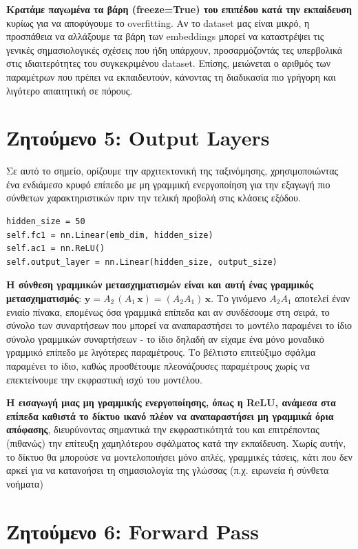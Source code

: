 \documentclass[12pt]{article}
\begin{document}
\textbf{Κρατάμε παγωμένα τα βάρη (freeze=True) του επιπέδου κατά την εκπαίδευση} κυρίως για να αποφύγουμε το overfitting. Αν το dataset μας είναι μικρό, η προσπάθεια να αλλάξουμε τα βάρη των embeddings μπορεί να καταστρέψει τις γενικές σημασιολογικές σχέσεις που ήδη υπάρχουν, προσαρμόζοντάς τες υπερβολικά στις ιδιαιτερότητες του συγκεκριμένου dataset. Επίσης, μειώνεται ο αριθμός των παραμέτρων που πρέπει να εκπαιδευτούν, κάνοντας τη διαδικασία πιο γρήγορη και λιγότερο απαιτητική σε πόρους.

\section{Ζητούμενο 5: Output Layers}

Σε αυτό το σημείο, ορίζουμε την αρχιτεκτονική της ταξινόμησης, χρησιμοποιώντας ένα ενδιάμεσο κρυφό επίπεδο με μη γραμμική ενεργοποίηση για την εξαγωγή πιο σύνθετων χαρακτηριστικών πριν την τελική προβολή στις κλάσεις εξόδου.

\begin{lstlisting}
hidden_size = 50
self.fc1 = nn.Linear(emb_dim, hidden_size)
self.ac1 = nn.ReLU()
self.output_layer = nn.Linear(hidden_size, output_size)
\end{lstlisting}


\textbf{Η σύνθεση γραμμικών μετασχηματισμών είναι και αυτή ένας γραμμικός μετασχηματισμός}:
$ \mathbf{y} = A_2\,(A_1\,\mathbf{x}) = (A_2 A_1)\,\mathbf{x} $.
Το γινόμενο $A_2 A_1$ αποτελεί έναν ενιαίο πίνακα, επομένως όσα γραμμικά επίπεδα και αν συνδέσουμε στη σειρά, το σύνολο των συναρτήσεων που μπορεί να αναπαραστήσει το μοντέλο παραμένει το ίδιο σύνολο γραμμικών συναρτήσεων - το ίδιο δηλαδή αν είχαμε ένα μόνο μοναδικό γραμμικό επίπεδο με λιγότερες παραμέτρους. Το βέλτιστο επιτεύξιμο σφάλμα παραμένει το ίδιο, καθώς προσθέτουμε πλεονάζουσες παραμέτρους χωρίς να επεκτείνουμε την εκφραστική ισχύ του μοντέλου.

\textbf{Η εισαγωγή μιας μη γραμμικής ενεργοποίησης, όπως η ReLU, ανάμεσα στα επίπεδα καθιστά το δίκτυο ικανό πλέον να αναπαραστήσει μη γραμμικά όρια απόφασης}, διευρύνοντας σημαντικά την εκφραστικότητά του και επιτρέποντας (πιθανώς) την επίτευξη χαμηλότερου σφάλματος κατά την εκπαίδευση. Χωρίς αυτήν, το δίκτυο θα μπορούσε να μοντελοποιήσει μόνο απλές, γραμμικές τάσεις, κάτι που δεν αρκεί για να κατανοήσει τη σημασιολογία της γλώσσας (π.χ. ειρωνεία ή σύνθετα νοήματα)



\section{Ζητούμενο 6: Forward Pass}
\end{document}

